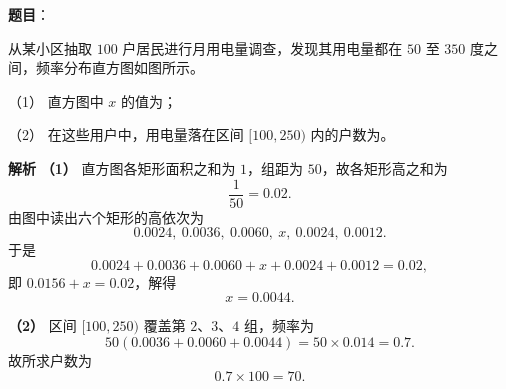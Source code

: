 \begin{answer}

\textbf{题目}：

从某小区抽取 $100$ 户居民进行月用电量调查，发现其用电量都在 $50$ 至 $350$ 度之间，频率分布直方图如图所示。

（1） 直方图中 $x$ 的值为\gkblank{}；

（2） 在这些用户中，用电量落在区间 $[100,250)$ 内的户数为\gkblank{}。
\nopagebreak[4]
\begin{center}\end{center}
\nopagebreak[4]
\textbf{解析}
\textbf{（1）} 直方图各矩形面积之和为 $1$，组距为 $50$，故各矩形高之和为
\nopagebreak[4]
\[\frac1{50}=0.02.\]
由图中读出六个矩形的高依次为
\nopagebreak[4]
\[0.0024,\ 0.0036,\ 0.0060,\ x,\ 0.0024,\ 0.0012.\]
于是
\nopagebreak[4]
\[0.0024+0.0036+0.0060+x+0.0024+0.0012=0.02,\]
即 $0.0156+x=0.02$，解得
\nopagebreak[4]
\[x=0.0044.\]

\textbf{（2）} 区间 $[100,250)$ 覆盖第 $2$、$3$、$4$ 组，频率为
\nopagebreak[4]
\[50(0.0036+0.0060+0.0044)=50\times0.014=0.7.\]
故所求户数为
\nopagebreak[4]
\[0.7\times100=70.\]



\end{answer}
